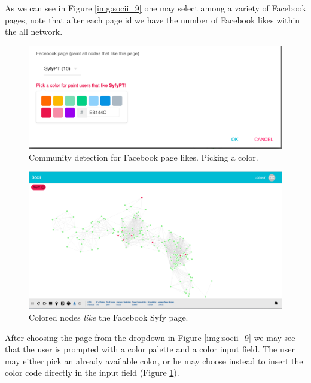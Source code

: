 As we can see in Figure \ref{img:socii_9} one may select among a variety of Facebook pages, note that after each page id we have the number of Facebook likes within the all network.

\begin{figure}[h!]
\begin{center}
  \hspace*{-0.8in}
  \includegraphics[width=1.2\textwidth]{img/socii/socii_10.png}
\end{center}
\caption{\label{img:socii_10} Community detection for Facebook page likes. Picking a color.}
\end{figure}

\begin{figure}[h!]
\begin{center}
  \hspace*{-0.8in}
  \includegraphics[width=1.2\textwidth]{img/socii/socii_11.png}
\end{center}
\caption{\label{img:socii_11} Colored nodes \textit{like} the Facebook Syfy page.}
\end{figure}

\indent After choosing the page from the dropdown in Figure \ref{img:socii_9} we may see that the user is prompted with a color palette and a color input field. The user may either pick an already available color, or he may choose instead to insert the color code directly in the input field (Figure \ref{img:socii_10}).

